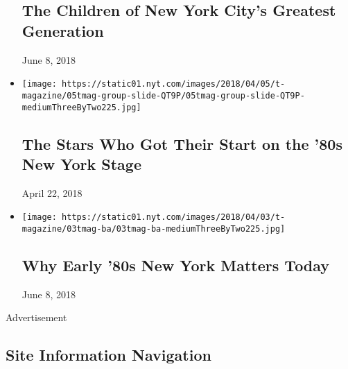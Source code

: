 \begin{itemize}
  \hypertarget{the-children-of-new-york-citys-greatest-generation}{%
  \subsection{The Children of New York City's Greatest
  Generation}\label{the-children-of-new-york-citys-greatest-generation}}

  June 8, 2018
\item
  \href{https://www.nytimes.com/2018/04/16/t-magazine/broadway-1980s-actors-sarah-jessica-parker-willem-dafoe.html}{}

  \texttt{[image: https://static01.nyt.com/images/2018/04/05/t-magazine/05tmag-group-slide-QT9P/05tmag-group-slide-QT9P-mediumThreeByTwo225.jpg]}

  \hypertarget{the-stars-who-got-their-start-on-the-80s-new-york-stage}{%
  \subsection{The Stars Who Got Their Start on the '80s New York
  Stage}\label{the-stars-who-got-their-start-on-the-80s-new-york-stage}}

  April 22, 2018
\item
  \href{https://www.nytimes.com/2018/04/17/t-magazine/why-new-york-city-1980s-matters.html}{}

  \texttt{[image: https://static01.nyt.com/images/2018/04/03/t-magazine/03tmag-ba/03tmag-ba-mediumThreeByTwo225.jpg]}

  \hypertarget{why-early-80s-new-york-matters-today}{%
  \subsection{Why Early '80s New York Matters
  Today}\label{why-early-80s-new-york-matters-today}}

  June 8, 2018
\end{itemize}

Advertisement

\hypertarget{site-information-navigation}{%
\subsection{Site Information
Navigation}\label{site-information-navigation}}

